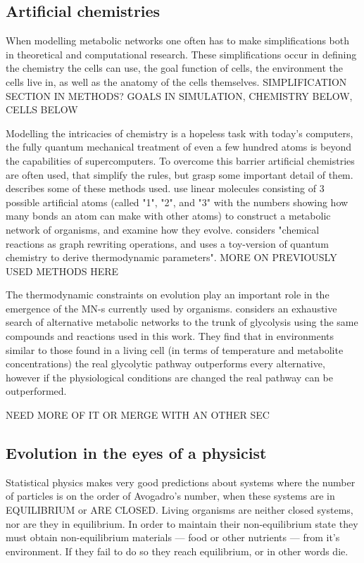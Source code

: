 \documentclass[a4paper,12pt]{article}
\begin{document}
	\subsection{Artificial chemistries}
	\label{sub:artificial_chemistries}


	When modelling metabolic networks one often has to make simplifications both in theoretical and computational research. These simplifications occur in defining the chemistry the cells can use, the goal function of cells, the environment the cells live in, as well as the anatomy of the cells themselves. SIMPLIFICATION SECTION IN METHODS? GOALS IN SIMULATION, CHEMISTRY BELOW, CELLS BELOW
	
	Modelling the intricacies of chemistry is a hopeless task with today's computers, the fully quantum mechanical treatment of even a few hundred atoms is beyond the capabilities of supercomputers. To overcome this barrier artificial chemistries are often used, that simplify the rules, but grasp some important detail of them. \cite{artificialreview} describes some of these methods used. \cite{evolutioncomplex} use linear molecules consisting of 3 possible  artificial atoms (called "1", "2", and "3" with the numbers showing how many bonds an atom can make with other atoms) to construct a metabolic network of organisms, and examine how they evolve. \cite{computationalframework} considers "chemical reactions as graph rewriting operations, and uses a toy-version of quantum chemistry to derive thermodynamic parameters". MORE ON PREVIOUSLY USED METHODS HERE
	
	The thermodynamic constraints on evolution play an important role in the emergence of the MN-s currently used by organisms. \cite{BartekLower} considers an exhaustive search of alternative metabolic networks to the trunk of glycolysis using the same compounds and reactions used in this work. They find that in environments similar to those found in a living cell (in terms of temperature and metabolite concentrations) the real glycolytic pathway outperforms every alternative, however if the physiological conditions are changed the real pathway can be outperformed.

	NEED MORE OF IT OR MERGE WITH AN OTHER SEC

	
	\subsection{Evolution in the eyes of a physicist}\label{chap:whereisphysics}

	Statistical physics makes very good predictions about systems where the number of particles is on the order of Avogadro's number, when these systems are in EQUILIBRIUM or ARE CLOSED. Living organisms are neither closed systems, nor are they in equilibrium. In order to maintain their non-equilibrium state they must obtain non-equilibrium materials --- food or other nutrients --- from it's environment. If they fail to do so they reach equilibrium, or in other words die. \cite{irreversibility}
\end{document}
